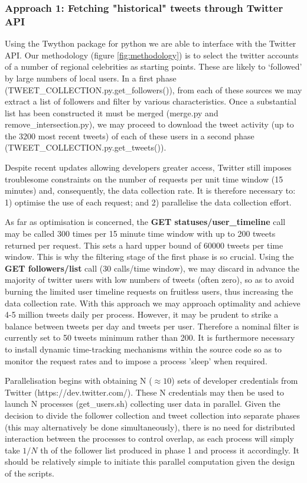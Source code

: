 \subsubsection*{Approach 1: Fetching "historical" tweets through Twitter API}
Using the Twython package for python we are able to interface with the Twitter API. Our methodology (figure \ref{fig:methodology}) is to select the twitter accounts of a number of regional celebrities as starting points. These are likely to `followed' by large numbers of local users. In a first phase (TWEET\_COLLECTION.py.get\_followers()), from each of these sources we may extract a list of followers and filter by various characteristics. Once a substantial list has been constructed it must be merged (merge.py and remove\_intersection.py), we may proceed to download the tweet activity (up to the 3200 most recent tweets) of each of these users in a second phase (TWEET\_COLLECTION.py.get\_tweets()).

Despite recent updates allowing developers greater access, Twitter still imposes troublesome constraints on the number of requests per unit time window (15 minutes) and, consequently, the data collection rate. It is therefore necessary to: 1) optimise the use of each request; and 2) parallelise the data collection effort.

As far as optimisation is concerned, the \textbf{GET statuses/user\_timeline} call may be called 300 times per 15 minute time window with up to 200 tweets returned per request. This sets a hard upper bound of 60000 tweets per time window. This is why the filtering stage of the first phase is so crucial. Using the \textbf{GET followers/list} call (30 calls/time window), we may discard in advance the majority of twitter users with low numbers of tweets (often zero), so as to avoid burning the limited user timeline requests on fruitless users, thus increasing the data collection rate. With this approach we may approach optimality and achieve 4-5 million tweets daily per process. However, it may be prudent to strike a balance between tweets per day and tweets per user. Therefore a nominal filter is currently set to 50 tweets minimum rather than 200. It is furthermore necessary to install dynamic time-tracking mechanisms within the source code so as to monitor the request rates and to impose a process 'sleep' when required.

Parallelisation begins with obtaining N ($\approx 10$) sets of developer credentials from Twitter (https://dev.twitter.com/). These N credentials may then be used to launch N processes (get\_users.sh) collecting user data in parallel. Given the decision to divide the follower collection and tweet collection into separate phases (this may alternatively be done simultaneously), there is no need for distributed interaction between the processes to control overlap, as each process will simply take $1/N$ th of the follower list produced in phase 1 and process it accordingly. It should be relatively simple to initiate this parallel computation given the design of the scripts.

